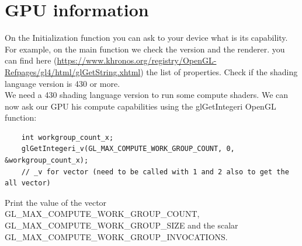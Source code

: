 \documentclass{article}
\begin{document}
\section{GPU information}
On the Initialization function you can ask to your device what is its capability. For example, on the main function we check the version and the renderer. you can find here (\href{https://www.khronos.org/registry/OpenGL-Refpages/gl4/html/glGetString.xhtml}{https://www.khronos.org/registry/OpenGL-Refpages/gl4/html/glGetString.xhtml}) the list of properties. Check if the shading language version is 430 or more.\\
We need a 430 shading language version to run some compute shaders. We can now ask our GPU his compute capabilities using the glGetIntegeri OpenGL function:
\begin{lstlisting}
	int workgroup_count_x;
	glGetIntegeri_v(GL_MAX_COMPUTE_WORK_GROUP_COUNT, 0, &workgroup_count_x);
	// _v for vector (need to be called with 1 and 2 also to get the all vector)
\end{lstlisting}
Print the value of the vector GL\_MAX\_COMPUTE\_WORK\_GROUP\_COUNT, GL\_MAX\_COMPUTE\_WORK\_GROUP\_SIZE and the scalar GL\_MAX\_COMPUTE\_WORK\_GROUP\_INVOCATIONS.
\end{document}
